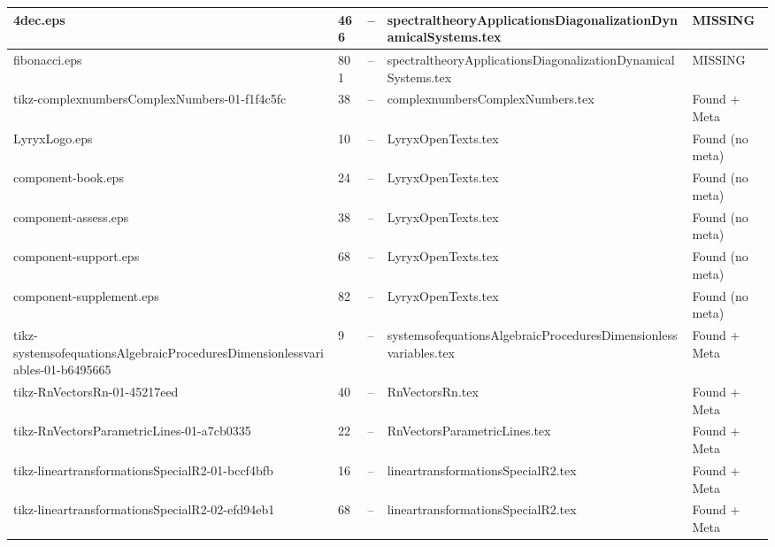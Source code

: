 \documentclass[11pt]{article}
\begin{document}
\begin{longtable}{|p{3.5cm}|p{1.5cm}|p{1cm}|p{4cm}|p{2cm}|}
4dec.eps & 466 & -- & spectraltheoryApplicationsDiagonalizationDynamicalSystems.tex & \textcolor{missing}{MISSING} \\
\hline

fibonacci.eps & 801 & -- & spectraltheoryApplicationsDiagonalizationDynamicalSystems.tex & \textcolor{missing}{MISSING} \\
\hline

tikz-complexnumbersComplexNumbers-01-f1f4c5fc & 38 & -- & complexnumbersComplexNumbers.tex & \textcolor{found}{Found + Meta} \\
\hline

LyryxLogo.eps & 10 & -- & LyryxOpenTexts.tex & \textcolor{warning}{Found (no meta)} \\
\hline

component-book.eps & 24 & -- & LyryxOpenTexts.tex & \textcolor{warning}{Found (no meta)} \\
\hline

component-assess.eps & 38 & -- & LyryxOpenTexts.tex & \textcolor{warning}{Found (no meta)} \\
\hline

component-support.eps & 68 & -- & LyryxOpenTexts.tex & \textcolor{warning}{Found (no meta)} \\
\hline

component-supplement.eps & 82 & -- & LyryxOpenTexts.tex & \textcolor{warning}{Found (no meta)} \\
\hline

tikz-systemsofequationsAlgebraicProceduresDimensionlessvariables-01-b6495665 & 9 & -- & systemsofequationsAlgebraicProceduresDimensionlessvariables.tex & \textcolor{found}{Found + Meta} \\
\hline

tikz-RnVectorsRn-01-45217eed & 40 & -- & RnVectorsRn.tex & \textcolor{found}{Found + Meta} \\
\hline

tikz-RnVectorsParametricLines-01-a7cb0335 & 22 & -- & RnVectorsParametricLines.tex & \textcolor{found}{Found + Meta} \\
\hline

tikz-lineartransformationsSpecialR2-01-bccf4bfb & 16 & -- & lineartransformationsSpecialR2.tex & \textcolor{found}{Found + Meta} \\
\hline

tikz-lineartransformationsSpecialR2-02-efd94eb1 & 68 & -- & lineartransformationsSpecialR2.tex & \textcolor{found}{Found + Meta} \\
\hline


\end{longtable}
\end{document}
